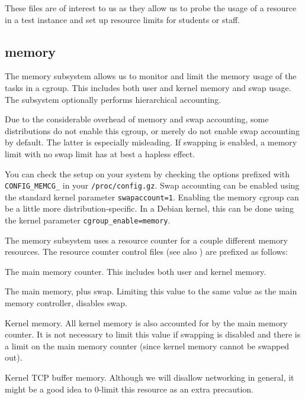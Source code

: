 These files are of interest to us as they allow us to probe the usage of a
resource in a test instance and set up resource limits for students or staff.

\subsection{memory}

The memory subsystem allows us to monitor and limit the memory usage of the
tasks in a cgroup\cite{memory.txt}. This includes both user and kernel memory
and swap usage.  The subsystem optionally performs hierarchical accounting.

Due to the considerable overhead of memory and swap accounting, some
distributions do not enable this cgroup, or merely do not enable swap
accounting by default. The latter is especially misleading. If swapping is
enabled, a memory limit with no swap limit has at best a hapless effect.

You can check the setup on your system by checking the options prefixed with
\texttt{CONFIG\_MEMCG\_} in your \texttt{/proc/config.gz}. Swap accounting can
be enabled using the standard kernel parameter
\texttt{swapaccount=1}\cite{kernel-parameters.txt}. Enabling the memory cgroup
can be a little more distribution-specific.  In a Debian kernel, this can be
done using the kernel parameter
\texttt{cgroup\_enable=memory}\cite{hutchings-2011}.

The memory subsystem uses a resource counter for a couple different memory
resources. The resource counter control files (see also
) are prefixed as follows:

\begin{description}[\setleftmargin{0.2in}\breaklabel\setlabelstyle{\tt}]

\item[memory]

The main memory counter. This includes both user and kernel memory.

\item[memory.memsw]

The main memory, plus swap. Limiting this value to the same value as the main
memory controller, disables swap.

\item[memory.kmem]

Kernel memory. All kernel memory is also accounted for by the main memory
counter. It is not necessary to limit this value if swapping is disabled and
there is a limit on the main memory counter (since kernel memory cannot be
swapped out).

\item[memory.kmem.tcp]

Kernel TCP buffer memory. Although we will disallow networking in general, it
might be a good idea to 0-limit this resource as an extra precaution.

\end{description}

